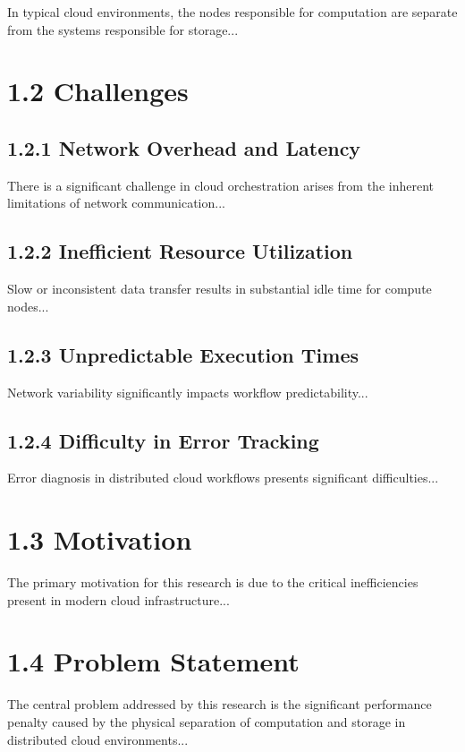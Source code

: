 \documentclass[12pt,a4paper]{report}
\begin{document}
In typical cloud environments, the nodes responsible for computation are separate from the systems responsible for storage...

\section*{1.2 Challenges}
\subsection*{1.2.1 Network Overhead and Latency}
There is a significant challenge in cloud orchestration arises from the inherent limitations of network communication...

\subsection*{1.2.2 Inefficient Resource Utilization}
Slow or inconsistent data transfer results in substantial idle time for compute nodes...

\subsection*{1.2.3 Unpredictable Execution Times}
Network variability significantly impacts workflow predictability...

\subsection*{1.2.4 Difficulty in Error Tracking}
Error diagnosis in distributed cloud workflows presents significant difficulties...

\section*{1.3 Motivation}
The primary motivation for this research is due to the critical inefficiencies present in modern cloud infrastructure...

\section*{1.4 Problem Statement}
The central problem addressed by this research is the significant performance penalty caused by the physical separation of computation and storage in distributed cloud environments...
\end{document}
